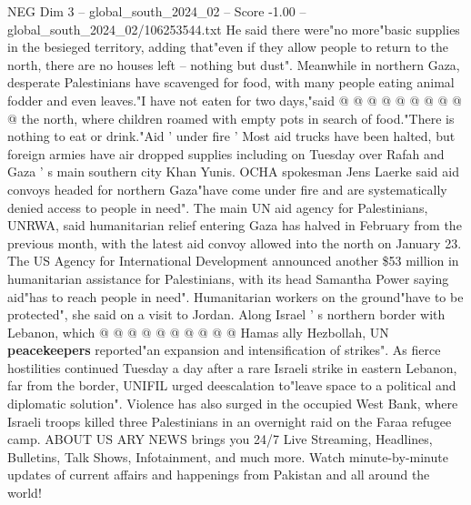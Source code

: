 \begin{textsample}{NEG Dim 3 – global\_south\_2024\_02 – Score -1.00 – global\_south\_2024\_02/106253544.txt}
He said there were"no more"basic supplies in the besieged territory, adding that"even if they allow people to return to the north, there are no houses left -- nothing but dust".
Meanwhile in northern Gaza, desperate Palestinians have scavenged for food, with many people eating animal fodder and even leaves."I have not eaten for two days,"said @ @ @ @ @ @ @ @ @ @ the north, where children roamed with empty pots in search of food."There is nothing to eat or drink."Aid ' under fire ' Most aid trucks have been halted, but foreign armies have air dropped supplies including on Tuesday over Rafah and Gaza ' s main southern city Khan Yunis.
OCHA spokesman Jens Laerke said aid convoys headed for northern Gaza"have come under fire and are systematically denied access to people in need".
The main UN aid agency for Palestinians, UNRWA, said humanitarian relief entering Gaza has halved in February from the previous month, with the latest aid convoy allowed into the north on January 23.
The US Agency for International Development announced another \$53 million in humanitarian assistance for Palestinians, with its head Samantha Power saying aid"has to reach people in need".
Humanitarian workers on the ground"have to be protected", she said on a visit to Jordan.
Along Israel ' s northern border with Lebanon, which @ @ @ @ @ @ @ @ @ @ Hamas ally Hezbollah, UN \textbf{peacekeepers} reported"an expansion and intensification of strikes".
As fierce hostilities continued Tuesday a day after a rare Israeli strike in eastern Lebanon, far from the border, UNIFIL urged deescalation to"leave space to a political and diplomatic solution".
Violence has also surged in the occupied West Bank, where Israeli troops killed three Palestinians in an overnight raid on the Faraa refugee camp.
ABOUT US ARY NEWS brings you 24/7 Live Streaming, Headlines, Bulletins, Talk Shows, Infotainment, and much more.
Watch minute-by-minute updates of current affairs and happenings from Pakistan and all around the world!

\end{textsample}
